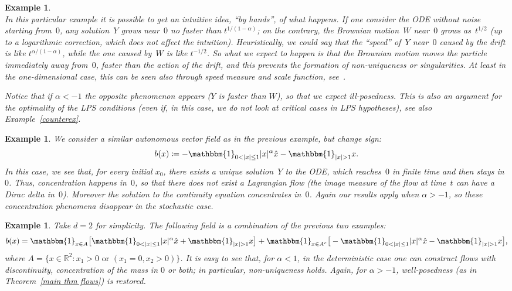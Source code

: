 \documentclass[a4paper,10pt]{article}
\newtheorem{example}[theorem]{Example}
\newcommand\1{\mathbbm{1}}
\newcommand{\mr}{\mathbb{R}}
\numberwithin{equation}{section}
\begin{document}
\begin{example}
\begin{minipage}{\linewidth}
\end{minipage}
\\[0.1cm]

In this particular example it is possible to get an intuitive idea, ``by hands'', of what happens. If one consider the ODE without noise starting from~$0$, any solution~$Y$ grows near~$0$ no faster than $t^{1/(1-\alpha)}$; on the contrary, the Brownian motion~$W$ near~$0$ grows as~$t^{1/2}$ \textup{(}up to a logarithmic correction, which does not affect the intuition\textup{)}. Heuristically, we could say that the ``speed'' of~$Y$ near~$0$ caused by the drift is like  $t^{\alpha/(1-\alpha)}$, while the one caused by~$W$ is like $t^{-1/2}$. So what we expect to happen is that the Brownian motion moves the particle immediately away from~$0$, faster than the action of the drift, and this prevents the formation of non-uniqueness or singularities. At least in the one-dimensional case, this can be seen also through speed measure and scale function, see~\textup{\cite{BREIMAN}}.

Notice that if $\alpha<-1$ the opposite phenomenon appears \textup{(}$Y$ is faster than $W$\textup{)}, so that we expect ill-posedness. This is also an argument for the optimality of the LPS conditions \textup{(}even if, in this case, we do not look at critical cases in LPS hypotheses\textup{)}, see also Example~\ref{counterex}.
\end{example}

\begin{example}
We consider a similar autonomous vector field as in the previous example, but change sign:
\begin{equation*}
b(x)\coloneqq - \1_{0<|x|\le1}|x|^{\alpha}\hat{x}- \1_{|x|>1}x.
\end{equation*}
In this case, we see that, for every initial $x_0$, there exists a unique solution~$Y$ to the ODE, which reaches~$0$ in finite time and then stays in~$0$. Thus, concentration happens in~$0$, so that there does not exist a Lagrangian flow \textup{(}the image measure of the flow at time~$t$ can have a Dirac delta in~$0$\textup{)}. Moreover the solution to the continuity equation concentrates in~$0$. Again our results apply when $\alpha>-1$, so these concentration phenomena disappear in the stochastic case.
\end{example}

\begin{example}
Take $d=2$ for simplicity. The following field is a combination of the previous two examples:
\begin{equation*}
b(x)= \1_{x\in A} \big[ \1_{0<|x|\le1}|x|^{\alpha}\hat{x}+ \1_{|x|>1}x \big]+ \1_{x\in A^c} \big[- \1_{0<|x|\le1}|x|^{\alpha}\hat{x}- \1_{|x|>1}x\big],
\end{equation*}
where $A=\{x\in\mr^2 \colon x_1>0\mbox{ or }(x_1=0,x_2>0)\}$. It is easy to see that, for $\alpha<1$, in the deterministic case one can construct flows with discontinuity, concentration of the mass in $0$ or both; in particular, non-uniqueness holds. Again, for $\alpha>-1$, well-posedness \textup{(}as in Theorem~\ref{main thm flows}\textup{)} is restored.
\end{example}
\end{document}
